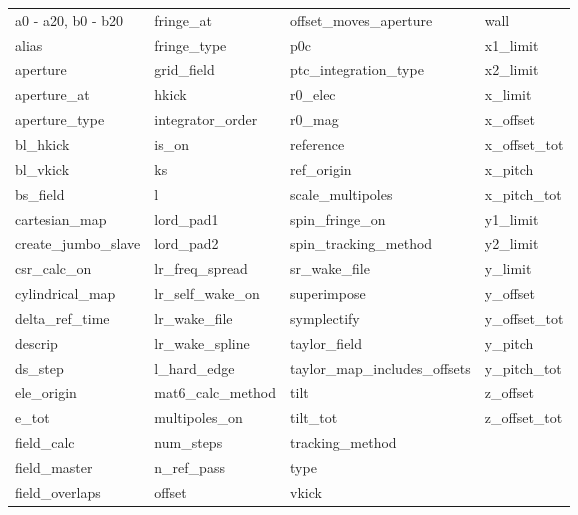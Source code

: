  \begin{tabular}{llll} \toprule
a0 - a20, b0 - b20          & fringe_at                   & offset_moves_aperture       & wall                        \\
alias                       & fringe_type                 & p0c                         & x1_limit                    \\
aperture                    & grid_field                  & ptc_integration_type        & x2_limit                    \\
aperture_at                 & hkick                       & r0_elec                     & x_limit                     \\
aperture_type               & integrator_order            & r0_mag                      & x_offset                    \\
bl_hkick                    & is_on                       & reference                   & x_offset_tot                \\
bl_vkick                    & ks                          & ref_origin                  & x_pitch                     \\
bs_field                    & l                           & scale_multipoles            & x_pitch_tot                 \\
cartesian_map               & lord_pad1                   & spin_fringe_on              & y1_limit                    \\
create_jumbo_slave          & lord_pad2                   & spin_tracking_method        & y2_limit                    \\
csr_calc_on                 & lr_freq_spread              & sr_wake_file                & y_limit                     \\
cylindrical_map             & lr_self_wake_on             & superimpose                 & y_offset                    \\
delta_ref_time              & lr_wake_file                & symplectify                 & y_offset_tot                \\
descrip                     & lr_wake_spline              & taylor_field                & y_pitch                     \\
ds_step                     & l_hard_edge                 & taylor_map_includes_offsets & y_pitch_tot                 \\
ele_origin                  & mat6_calc_method            & tilt                        & z_offset                    \\
e_tot                       & multipoles_on               & tilt_tot                    & z_offset_tot                \\
field_calc                  & num_steps                   & tracking_method             &                             \\
field_master                & n_ref_pass                  & type                        &                             \\
field_overlaps              & offset                      & vkick                       &                             \\
 \bottomrule
 \end{tabular}
